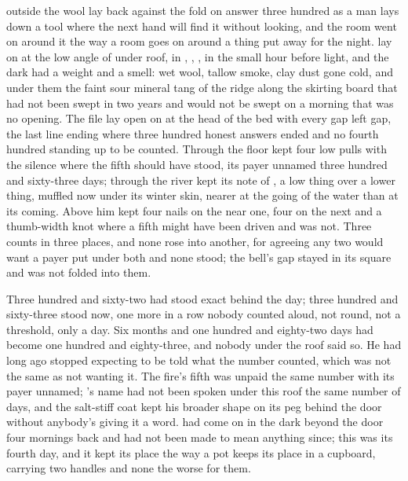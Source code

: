 
 outside the wool lay back against the fold on answer three hundred as a man lays down a tool where the next hand will find it without looking, and the room went on around it the way a room goes on around a thing put away for the night.  lay on  at the low angle of  under  roof, in , , , in the small hour before light, and the dark had a weight and a smell: wet wool, tallow smoke, clay dust gone cold, and under them the faint sour mineral tang of the ridge along the skirting board that had not been swept in two years and would not be swept on a morning that was no opening. The file lay open on  at the head of the bed with every gap left gap, the last line ending where three hundred honest answers ended and no fourth hundred standing up to be counted. Through the floor  kept four low pulls with the silence where the fifth should have stood, its payer unnamed three hundred and sixty-three days; through  the river kept its note of , a low thing over a lower thing, muffled now under its winter skin, nearer at the going of the water than at its coming. Above him  kept four nails on the near one, four on the next and a thumb-width knot where a fifth might have been driven and was not. Three counts in three places, and none rose into another, for agreeing any two would want a payer put under both and none stood; the bell's gap stayed in its square and was not folded into them.

Three hundred and sixty-two had stood exact behind the day; three hundred and sixty-three stood now, one more in a row nobody counted aloud, not round, not a threshold, only a day. Six months and one hundred and eighty-two days had become one hundred and eighty-three, and nobody under the roof said so. He had long ago stopped expecting to be told what the number counted, which was not the same as not wanting it. The fire's fifth was unpaid the same number with its payer unnamed; 's name had not been spoken under this roof the same number of days, and the salt-stiff coat kept his broader shape on its peg behind the door without anybody's giving it a word.  had come on in the dark beyond the door four mornings back and had not been made to mean anything since; this was its fourth day, and it kept its place the way a pot keeps its place in a cupboard, carrying two handles and none the worse for them.


